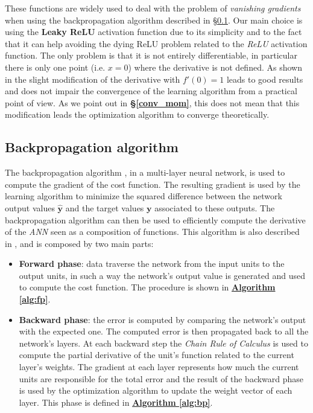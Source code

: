 These functions are widely used to deal with the problem of \textit{vanishing gradients} when using the backpropagation algorithm described in \S\ref{backprop}. Our main choice is using the \textbf{Leaky ReLU} activation function due to its simplicity and to the fact that it can help avoiding the dying ReLU problem related to the \textit{ReLU} activation function. The only problem is that it is not entirely differentiable, in particular there is only one point (i.e. $x=0$) where the derivative is not defined. As shown in \parencite[Chap. 6.3]{bengio} the slight modification of the derivative with \textit{$f'(0) = 1$} leads to good results and does not impair the convergence of the learning algorithm from a practical point of view. As we point out in \textbf{\S\ref{conv_mom}}, this does not mean that this modification leads the optimization algorithm to converge theoretically.

\subsection{Backpropagation algorithm}
\label{backprop}
The backpropagation algorithm \parencite[see][Chap. 6.5.4]{bengio}, in a multi-layer neural network, is used to compute the gradient of the cost function. The resulting gradient is used by the learning algorithm to minimize the squared difference between the network output values $\hat{\textbf{y}}$ and the target values $\textbf{y}$ associated to these outputs. The backpropagation algorithm can then be used to efficiently compute the derivative of the \textit{ANN} seen as a composition of functions.\newline
This algorithm is also described in \cite{MLmitchell}, \cite{haykin_neural_2009} and is composed by two main parts:
\begin{itemize}
    \item \textbf{Forward phase}: data traverse the network from the input units to the output units, in such a way the network's output value is generated and used to compute the cost function. The procedure is shown in \hyperref[alg:fp]{\textbf{Algorithm \ref{alg:fp}}}.
    \item \textbf{Backward phase}: the error is computed by comparing the network's output with the expected one. The computed error is then propagated back to all the network's layers. At each backward step the \textit{Chain Rule of Calculus} is used to compute the partial derivative of the unit's function related to the current layer's weights. The gradient at each layer represents how much the current units are responsible for the total error and the result of the backward phase is used by the optimization algorithm to update the weight vector of each layer. This phase is defined in \hyperref[alg:bp]{\textbf{Algorithm \ref{alg:bp}}}.
\end{itemize}

